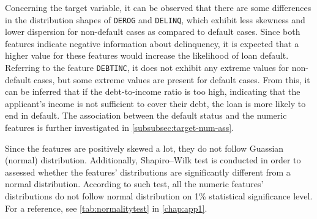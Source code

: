 Concerning the target variable, it can be observed that there are some differences in the distribution shapes of \texttt{DEROG} and \texttt{DELINQ}, which exhibit less skewness and lower dispersion for non-default cases as compared to default cases.
Since both features indicate negative information about delinquency, it is expected that a higher value for these features would increase the likelihood of loan default.
Referring to the feature \texttt{DEBTINC}, it does not exhibit any extreme values for non-default cases, but some extreme values are present for default cases.
From this, it can be inferred that if the debt-to-income ratio is too high, indicating that the applicant's income is not sufficient to cover their debt, the loan is more likely to end in default.
The association between the default status and the numeric features is further investigated in \autoref{subsubsec:target-num-ass}.

Since the features are positively skewed a lot, they do not follow Guassian (normal) distribution. Additionally, Shapiro--Wilk test is conducted in order to assessed whether the features' distributions are significantly different from a normal distribution.
According to such test, all the numeric features' distributions do not follow normal distribution on 1\% statistical significance level.
For a reference, see \autoref{tab:normalitytest} in \autoref{chap:app1}.

